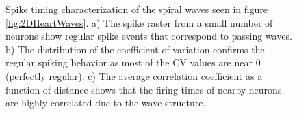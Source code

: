 \begin{figure}[!htb]
 \caption{Spike timing characterization of the spiral waves seen in figure \ref{fig:2DHeartWaves}.
          a) The spike raster from a small number of neurons show regular spike events that correspond to passing waves.
          b) The distribution of the coefficient of variation confirms the regular spiking behavior as most of the CV values are near 0 (perfectly regular).
          c) The average correlation coefficient as a function of distance shows that the firing times of nearby neurons are highly correlated due to the wave structure.
          } 
 \label{fig:2DSpiralWave_SpikeTiming}
\end{figure}
 \FloatBarrier
 

